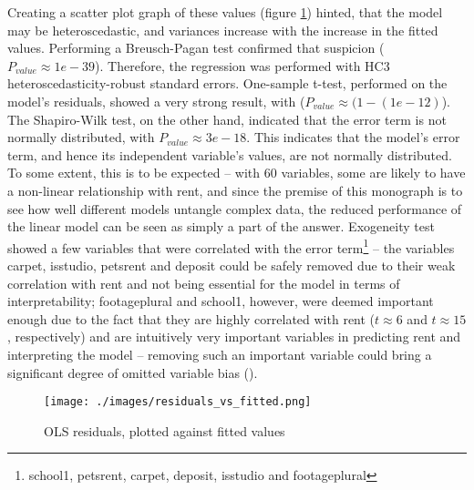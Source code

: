 \documentclass[12pt]{report}
\begin{document}
Creating a scatter plot graph of these values (figure \ref{fig:heteroscedasticity}) hinted, that the model may be heteroscedastic, and variances increase with the increase in the fitted values. Performing a Breusch-Pagan test confirmed that suspicion ($P_{value}\approx1e-39$). Therefore, the regression was performed with HC3 heteroscedasticity-robust standard errors. One-sample t-test, performed on the model's residuals, showed a very strong result, with ($P_{value}\approx(1-(1e-12)$). The Shapiro-Wilk test, on the other hand, indicated that the error term is not normally distributed, with $P_{value}\approx3e-18$. This indicates that the model's error term, and hence its independent variable's values, are not normally distributed. To some extent, this is to be expected -- with 60 variables, some are likely to have a non-linear relationship with rent, and since the premise of this monograph is to see how well different models untangle complex data, the reduced performance of the linear model can be seen as simply a part of the answer. Exogeneity test showed a few variables that were correlated with the error term\footnote{school1, pets\textunderscore rent, carpet, deposit,  is\textunderscore studio and footageplural} -- the variables carpet, is\textunderscore studio, pets\textunderscore rent and deposit could be safely removed due to their weak correlation with rent and not being essential for the model in terms of interpretability; footageplural and school1, however, were deemed important enough due to the fact that they are highly correlated with rent ($t\approx6$ and $t\approx15$, respectively) and are intuitively very important variables in predicting rent and interpreting the model -- removing such an important variable could bring a significant degree of omitted variable bias (\cite{walsch2021}).

\begin{figure}[ht]
	\centering
	\texttt{[image: ./images/residuals\_vs\_fitted.png]}
	\caption{OLS residuals, plotted against fitted values}
	\label{fig:heteroscedasticity}
\end{figure}
\end{document}
